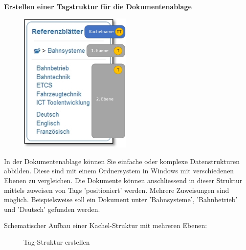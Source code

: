 \textbf{Erstellen einer Tagstruktur für die Dokumentenablage}

\vspace{\baselineskip}

\begin{figure}
\vspace{-30pt}
\includegraphics[height=70mm]{../chapters/13_Konfigurationen/pictures/DokTagStruktur.jpg}
\end{figure}

In der Dokumentenablage können Sie einfache oder komplexe Datenstrukturen abbilden. Diese sind mit einem Ordnersystem in Windows mit verschiedenen Ebenen zu vergleichen. Die Dokumente können anschliessend in dieser Struktur mittels zuweisen von Tags 'positioniert' werden. Mehrere Zuweisungen sind möglich. Beispielsweise soll ein Dokument unter 'Bahnsysteme', 'Bahnbetrieb' und 'Deutsch' gefunden werden.

\vspace{3cm} 

Schematischer Aufbau einer Kachel-Struktur mit mehreren Ebenen:

\begin{figure}[H]
\caption{Tag-Struktur erstellen}
\end{figure}

